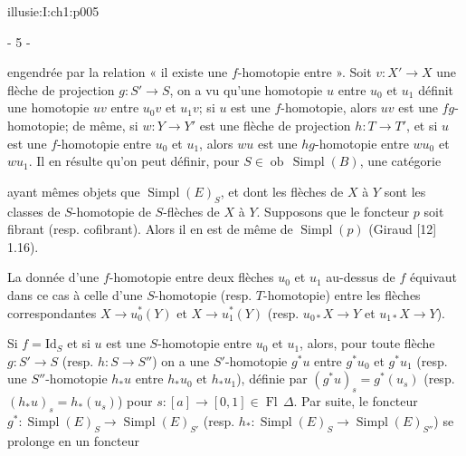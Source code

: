 \IllusieSetPhysicalPageSize{447bp}{698.6bp}
\begin{illusiebodypage}{illusie:I:ch1:p005}
\begin{center}- 5 -\end{center}
\vspace{7bp}\fontsize{9}{18}\selectfont

\hypertarget{illusie:I:ch1:s1:1:p14c1}{}%
\noindent engendrée par la relation « il existe une $f$-homotopie entre ».
Soit $v:X'\longrightarrow X$ une flèche de projection
$g:S'\longrightarrow S$, on a vu qu'une homotopie $u$ entre $u_0$ et $u_1$
définit une homotopie $uv$ entre $u_0v$ et $u_1v$; si $u$ est une
$f$-homotopie, alors $uv$ est une $fg$-homotopie; de même, si
$w:Y\longrightarrow Y'$ est une flèche de projection $h:T\longrightarrow T'$,
et si $u$ est une $f$-homotopie entre $u_0$ et $u_1$, alors $wu$ est une
$hg$-homotopie entre $wu_0$ et $wu_1$. Il en résulte qu'on peut définir, pour
$S\in\operatorname{ob}\,\operatorname{Simpl}(B)$, une catégorie

\hypertarget{illusie:I:ch1:s1:1:eq6}{}%
\noindent{}\par

\hypertarget{illusie:I:ch1:s1:1:p15}{}%
ayant mêmes objets que $\operatorname{Simpl}(E)_S$, et dont les flèches de $X$
à $Y$ sont les classes de $S$-homotopie de $S$-flèches de $X$ à $Y$.
Supposons que le foncteur $p$ soit fibrant (resp. cofibrant). Alors il en est
de même de $\operatorname{Simpl}(p)$ (Giraud [12] 1.16).

\hypertarget{illusie:I:ch1:s1:1:p16}{}%
La donnée d'une $f$-homotopie entre deux flèches $u_0$ et $u_1$ au-dessus de
$f$ équivaut dans ce cas à celle d'une $S$-homotopie (resp. $T$-homotopie)
entre les flèches correspondantes $X\longrightarrow u_0^*(Y)$ et
$X\longrightarrow u_1^*(Y)$ (resp. $u_{0*}X\longrightarrow Y$ et
$u_{1*}X\longrightarrow Y$).

\hypertarget{illusie:I:ch1:s1:1:p17}{}%
Si $f=\mathrm{Id}_S$ et si $u$ est une $S$-homotopie entre $u_0$ et
$u_1$, alors, pour toute flèche $g:S'\longrightarrow S$ (resp.
$h:S\longrightarrow S''$) on a une $S'$-homotopie $g^*u$ entre $g^*u_0$ et
$g^*u_1$ (resp. une $S''$-homotopie $h_*u$ entre $h_*u_0$ et $h_*u_1$),
\hypertarget{illusie:I:ch1:s1:1:d8}{}%
définie par $(g^*u)_s=g^*(u_s)$ (resp. $(h_*u)_s=h_*(u_s)$) pour
$s:[a]\longrightarrow[0,1]\in\operatorname{Fl}\,\Delta$. Par suite, le
foncteur $g^*:\operatorname{Simpl}(E)_S\longrightarrow
\operatorname{Simpl}(E)_{S'}$ (resp.
$h_*:\operatorname{Simpl}(E)_S\longrightarrow\operatorname{Simpl}(E)_{S''}$)
se prolonge en un foncteur


\end{illusiebodypage}
